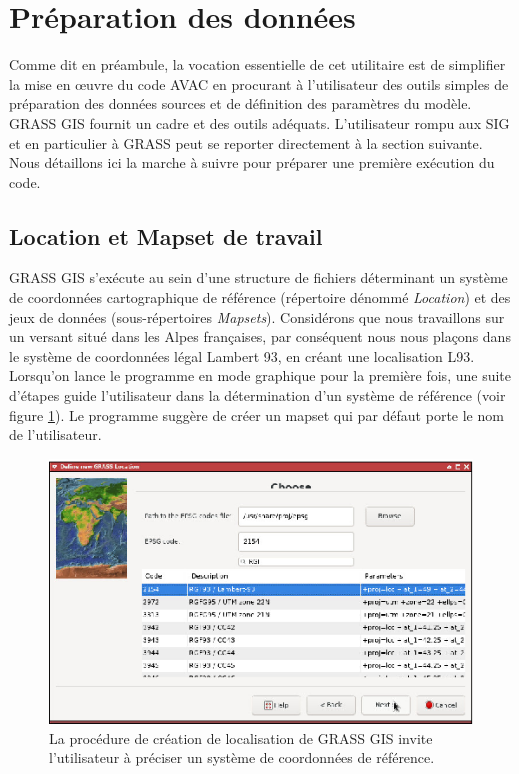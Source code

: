 \documentclass[12pt,oneside]{paper}
\begin{document}
\section{Préparation des données}

Comme dit en préambule, la vocation essentielle de cet utilitaire est de simplifier la mise en œuvre du code AVAC en procurant à l'utilisateur des outils simples de préparation des données sources et de définition des paramètres du modèle. GRASS GIS fournit un cadre et des outils adéquats. L'utilisateur rompu aux SIG et en particulier à GRASS peut se reporter directement à la section suivante. Nous détaillons ici la marche à suivre pour préparer une première exécution du code.

\subsection{Location et Mapset de travail}

GRASS GIS s'exécute au sein d'une structure de fichiers déterminant un système de coordonnées cartographique de référence (répertoire dénommé \emph{Location}) et des jeux de données (sous-répertoires \emph{Mapsets}). Considérons que nous travaillons sur un versant situé dans les Alpes françaises, par conséquent nous nous plaçons dans le système de coordonnées légal Lambert 93, en créant une localisation L93. Lorsqu'on lance le programme en mode graphique pour la première fois, une suite d'étapes guide l'utilisateur dans la détermination d'un système de référence (voir figure \ref{fig:location}). Le programme suggère de créer un mapset qui par défaut porte le nom de l'utilisateur.


\begin{figure}[!h]
\begin{center}
\includegraphics[width=0.70\hsize]{capture0.eps}
\caption{La procédure de création de localisation de GRASS GIS invite l'utilisateur à préciser un système de coordonnées de référence.}
\label{fig:location}
\end{center}
\end{figure}
\end{document}
